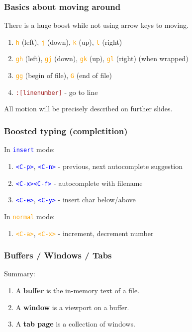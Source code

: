 \documentclass{beamer}
\newcommand{\viminsert}[1]{\texttt{\textcolor{blue}{#1}}}
\newcommand{\vimnormal}[1]{\texttt{\textcolor{orange}{#1}}}
\newcommand{\vimcommand}[1]{\texttt{\textcolor{brown}{#1}}}
\newcommand{\vimkey}[1]{\textless{}#1\textgreater{}}
\begin{document}
\begin{frame}
    \frametitle{Basics about moving around}
    There is a huge boost while not using arrow keys to moving.
    \begin{enumerate}
        \item \vimnormal{h} (left), \vimnormal{j} (down), \vimnormal{k} (up), \vimnormal{l} (right) \\
        \item \vimnormal{gh} (left), \vimnormal{gj} (down), \vimnormal{gk} (up), \vimnormal{gl} (right) (when wrapped)\\
        \item \vimnormal{gg} (begin of file), \vimnormal{G} (end of file) \\
        \item \vimcommand{:[linenumber]} - go to line
    \end{enumerate}
    All motion will be precisely described on further slides.
\end{frame}

\begin{frame}
    \frametitle{Boosted typing (completition)}
    In \viminsert{insert} mode:
    \begin{enumerate}
        \item \viminsert{\vimkey{C-p}}, \viminsert{\vimkey{C-n}} - previous, next autocomplete suggestion
        \item \viminsert{\vimkey{C-x}\vimkey{C-f}} - autocomplete with filename 
        \item \viminsert{\vimkey{C-e}}, \viminsert{\vimkey{C-y}} - insert char below/above
    \end{enumerate}
    In \vimnormal{normal} mode:
    \begin{enumerate}
        \item \vimnormal{\vimkey{C-a}}, \vimnormal{\vimkey{C-x}} - increment, decrement number 
    \end{enumerate}
\end{frame}

\begin{frame}
    \frametitle{Buffers / Windows / Tabs}
    Summary:
    \begin{enumerate}
        \item A \textbf{buffer} is the in-memory text of a file.
        \item A \textbf{window} is a viewport on a buffer.
        \item A \textbf{tab page} is a collection of windows.
    \end{enumerate}
\end{frame}
\end{document}
